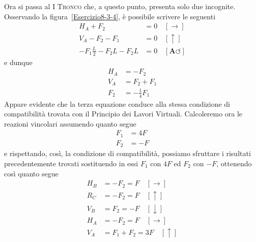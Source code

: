 Ora si passa al \textsc{I Tronco} che, a questo punto, presenta solo due incognite. Osservando la figura~\ref{Esercizio8-3-4}, è possibile scrivere le seguenti
\begin{align*}
H_A + F_2 &= 0 \quad [\rightarrow] \\
V_A - F_2 - F_1 &= 0 \quad [\uparrow] \\ 
-F_{1}\frac{L}{2} -F_{2}L - F_{2}L &= 0 \quad [\mathbf{A}\circlearrowleft] 
\end{align*}
e dunque
\begin{align*}
H_A &= -F_2  \\
V_A &=  F_2+F_1  \\ 
F_2 &= -\frac{1}{4}F_1 
\end{align*}
Appare evidente che la terza equazione conduce alla stessa condizione di compatibilità trovata con il Principio dei Lavori Virtuali. Calcoleremo ora le reazioni vincolari assumendo quanto segue
\begin{align*}
F_1 &= 4F  \\
F_2 &= -F
\end{align*}
e rispettando, così, la condizione di compatibilità, possiamo sfruttare i risultati precedentemente trovati sostituendo in essi $F_1$ con $4F$ ed $F_2$ con $-F$, ottenendo così quanto segue
\begin{align*}
H_B &= -F_2 = F \quad [\rightarrow]  \\
R_C &= -F_2 = F \quad [\uparrow] \\
V_B &= F_2 = -F \quad [\downarrow] \\
H_A &= -F_2 = F \quad [\rightarrow] \\ 
V_A &= F_1 + F_2 = 3F \quad [\uparrow] 
\end{align*}
